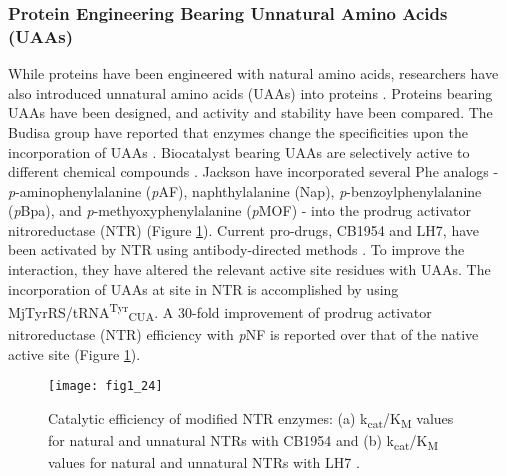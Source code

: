 \begin{refsection}
\subsubsection{Protein Engineering Bearing Unnatural Amino Acids (UAAs)}
\label{sec:uaa-intro}

While proteins have been engineered with natural amino acids, researchers
have also introduced unnatural amino acids (UAAs) into proteins
\cite{Odar2015,Hassan2008,Kiick2000,Hammill2007,Meinnel1990,Johnson2010}.
Proteins bearing UAAs have been designed, and activity and stability have been
compared. The Budisa group have reported that enzymes change the specificities
upon the incorporation of UAAs \cite{Budisa2006}. Biocatalyst bearing UAAs are
selectively active to different chemical compounds \cite{Jackson2006a}.
Jackson  have incorporated several Phe analogs -
\emph{p}-aminophenylalanine (\emph{p}AF), naphthylalanine (Nap),
\emph{p}-benzoylphenylalanine (\emph{p}Bpa), and \emph{p}-methyoxyphenylalanine
(\emph{p}MOF) - into the prodrug activator nitroreductase (NTR)
\cite{Jackson2006a} (Figure \ref{fig:selectivity-example}). Current pro-drugs,
CB1954 and LH7, have been activated by NTR using antibody-directed methods
\cite{Grove2003}. To improve the interaction, they have altered the relevant
active site residues with UAAs. The incorporation of UAAs at site in NTR is
accomplished by using MjTyrRS/tRNA\textsuperscript{Tyr}\textsubscript{CUA}. A
30-fold improvement of prodrug activator nitroreductase (NTR) efficiency with
\emph{p}NF is reported over that of the native active site \cite{Jackson2006a}
(Figure \ref{fig:selectivity-example}).
\begin{figure}[htbp] \centering \texttt{[image: fig1\_24]}
    \caption[Catalytic efficiency of modified NTR enzymes: (a)
        k\textsubscript{cat}/K\textsubscript{M} values for natural and
        unnatural NTRs with CB1954 and (b)
        k\textsubscript{cat}/K\textsubscript{M} values for natural and
    unnatural NTRs with LH7.]{Catalytic efficiency of modified NTR enzymes: (a)
        k\textsubscript{cat}/K\textsubscript{M} values for natural and
        unnatural NTRs with CB1954 and (b)
        k\textsubscript{cat}/K\textsubscript{M} values for natural and
        unnatural NTRs with LH7 \cite{Jackson2006a}.} 
        \label{fig:selectivity-example}
\end{figure}


\end{refsection}
